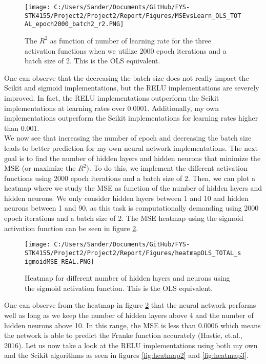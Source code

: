 \documentclass[12pt,a4paper]{article}
\begin{document}
\begin{figure}[H]
\centering
\texttt{[image: C:/Users/Sander/Documents/GitHub/FYS-STK4155/Project2/Project2/Report/Figures/MSEvsLearn\_OLS\_TOTAL\_epoch2000\_batch2\_r2.PNG]}
\caption{\label{fig:MSEvsLrateTOTAL8} The $R^2$ as function of number of learning rate for the three activation functions when we utilize 2000 epoch iterations and a batch size of 2. This is the OLS equivalent.}
\end{figure}

\noindent One can observe that the decreasing the batch size does not really impact the Scikit and sigmoid implementations, but the RELU implementations are severely improved. In fact, the RELU implementations outperform the Scikit implementations at learning rates over 0.0001. Additionally, my own implementations outperform the Scikit implementations for learning rates higher than 0.001.
\\
We now see that increasing the number of epoch and decreasing the batch size leads to better prediction for my own neural network implementations. The next goal is to find the number of hidden layers and hidden neurons that minimize the MSE (or maximize the $R^2$). To do this, we implement the different activation functions using 2000 epoch iterations and a batch size of 2. Then, we can plot a heatmap where we study the MSE as function of the number of hidden layers and hidden neurons. We only consider hidden layers between 1 and 10 and hidden neurons between 1 and 90, as this task is computationally demanding using 2000 epoch iterations and a batch size of 2. The MSE heatmap using the sigmoid activation function can be seen in figure \ref{fig:heatmap1}.

\begin{figure}[H]
\centering
\texttt{[image: C:/Users/Sander/Documents/GitHub/FYS-STK4155/Project2/Project2/Report/Figures/heatmapOLS\_TOTAL\_sigmoidMSE\_REAL.PNG]}
\caption{\label{fig:heatmap1} Heatmap for different number of hidden layers and neurons using the sigmoid activation function. This is the OLS equivalent.}
\end{figure}

\noindent One can observe from the heatmap in figure \ref{fig:heatmap1} that the neural network performs well as long as we keep the number of hidden layers above 4 and the number of hidden neurons above 10. In this range, the MSE is less than $0.0006$ which means the network is able to predict the Franke function accurately (Hastie, et.al., 2016). Let us now take a look at the RELU implementations using both my own and the Scikit algorithms as seen in figures \ref{fig:heatmap2} and \ref{fig:heatmap3}.
\end{document}
